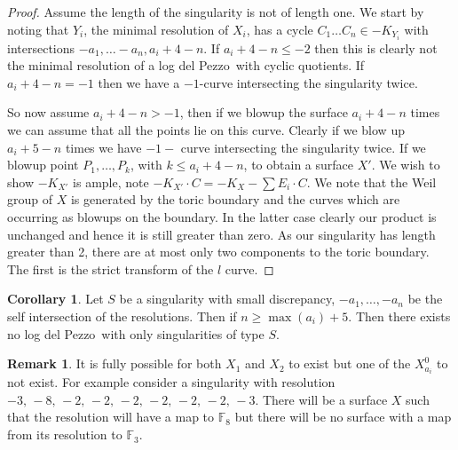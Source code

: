 \documentclass[11pt]{amsbook}
\theoremstyle{definition}
\theoremstyle{definition}
\newtheorem{cor}[thm]{Corollary}
\theoremstyle{definition}
\theoremstyle{definition}
\theoremstyle{definition}
\theoremstyle{definition}
\theoremstyle{definition}
\theoremstyle{definition}
\newtheorem*{rem}{Remark}
\newcommand{\ldp}{log del Pezzo}
\newcommand{\mb}[1]{\mathbb{#1}}
\begin{document}
\begin{proof}
Assume the length of the singularity is not of length one. We start by noting that $Y_i$, the minimal resolution of $X_i$, has a cycle $C_1 \dots C_n \in -K_{Y_i}$ with intersections $-a_1, \dots -a_n, a_i+4-n$. If $a_i+4 -n \leq -2$ then this is clearly not the minimal resolution of a \ldp\ with cyclic quotients. If $a_i+4-n = -1$ then we have a $-1$-curve intersecting the singularity twice. 



So now assume $a_i + 4-n > -1$, then if we blowup the surface $a_i + 4 -n $ times we can assume that all the points lie on this curve. Clearly if we blow up $a_i + 5 - n$ times we have $-1-$ curve intersecting the singularity twice. If we blowup point $P_1, \dots, P_k$, with $k \leq a_i + 4 - n$, to obtain a surface $X'$. We wish to show $-K_{X'}$ is ample, note $-K_{X'}\cdot C = -K_{X} - \sum{E_i} \cdot C$. We note that the Weil group of $X$ is generated by the toric boundary and the curves which are occurring as blowups on the boundary. In the latter case clearly our product is unchanged and hence it is still greater than zero. As our singularity has length greater than 2, there are at most only two components to the toric boundary. The first is the strict transform of the $l$ curve. 
\end{proof}
\begin{cor}
Let $S$ be a singularity with small discrepancy, $-a_1, \dots , -a_n$ be the self intersection of the resolutions. Then if $n \geq \max (a_i) + 5 $. Then there exists no \ldp\ with only singularities of type $S$.
\end{cor}
\begin{rem}
It is fully possible for both $X_1$ and $X_2$ to exist but one of the $X_{a_i}^0$ to not exist. For example consider a singularity with resolution $-3, \, -8, \, -2, \, -2, \, -2, \, -2, \, -2, \, -2, \, -3$. There will be a surface $X$ such that the resolution will have a map to $\mb{F}_8$ but there will be no surface with a map from its resolution to $\mb{F}_3$.
\end{rem}
\end{document}
